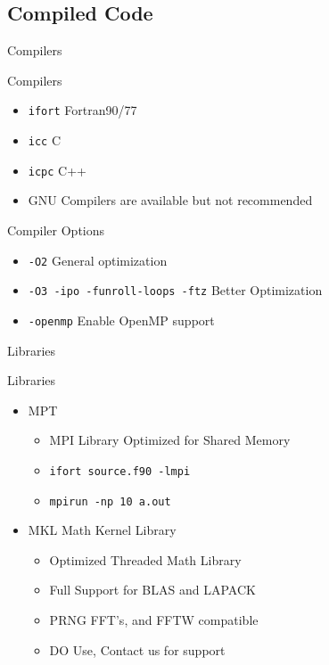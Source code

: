 \documentclass[handout]{beamer}
\begin{document}
\subsection{Compiled Code}
\begin{frame}{Compilers}
 \begin{block}{Compilers}
  \begin{itemize}
   \item<1->{\texttt{ifort} Fortran90/77}
   \item<1->{\texttt{icc} C }
   \item<1->{\texttt{icpc} C++}
   \item<2->{GNU Compilers are available but not recommended}
  \end{itemize}
 \end{block}
 \begin{block}{Compiler Options}
  \begin{itemize}
   \item<3->{\texttt{-O2} General optimization}
   \item<3->{\texttt{-O3 -ipo -funroll-loops -ftz} Better Optimization}
   \item<3->{\texttt{-openmp} Enable OpenMP support}
  \end{itemize}
 \end{block}
\end{frame}
\begin{frame}{Libraries}
 \begin{block}{Libraries}
  \begin{itemize}
   \item<1->{MPT}
   \begin{itemize}
    \item<1->{MPI Library Optimized for Shared Memory}
    \item<2->{\texttt{ifort source.f90 -lmpi}}
    \item<2->{\texttt{mpirun -np 10 a.out}}
   \end{itemize}
   \item<3->{MKL Math Kernel Library}
    \begin{itemize}
     \item{Optimized Threaded Math Library}
     \item{Full Support for BLAS and LAPACK}
     \item{PRNG FFT's, and FFTW compatible}
     \item{\alert{DO} Use, Contact us for support}
    \end{itemize}
  \end{itemize}
 \end{block}

\end{frame}
\end{document}
